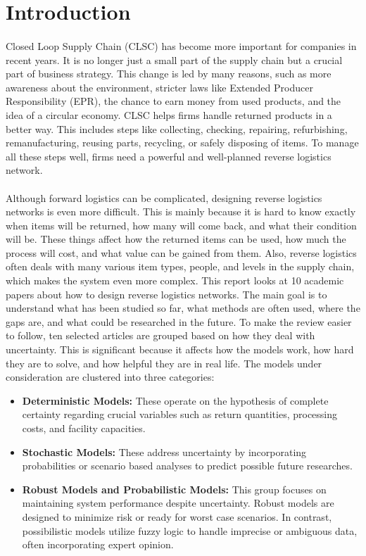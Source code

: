 \section{Introduction}

\paragraph{} Closed Loop Supply Chain (CLSC) has become more important for companies in recent years. It is no longer just a small part of the supply chain but a crucial part of business strategy. This change is led by many reasons, such as more awareness about the environment, stricter laws like Extended Producer Responsibility (EPR), the chance to earn money from used products, and the idea of a circular economy. CLSC helps firms handle returned products in a better way. This includes steps like collecting, checking, repairing, refurbishing, remanufacturing, reusing parts, recycling, or safely disposing of items. To manage all these steps well, firms need a powerful and well-planned reverse logistics network.

\paragraph{} Although forward logistics can be complicated, designing reverse logistics networks is even more difficult. This is mainly because it is hard to know exactly when items will be returned, how many will come back, and what their condition will be. These things affect how the returned items can be used, how much the process will cost, and what value can be gained from them. Also, reverse logistics often deals with many various item types, people, and levels in the supply chain, which makes the system even more complex.
This report looks at 10 academic papers about how to design reverse logistics networks. The main goal is to understand what has been studied so far, what methods are often used, where the gaps are, and what could be researched in the future. To make the review easier to follow, ten selected articles are grouped based on how they deal with uncertainty. This is significant because it affects how the models work, how hard they are to solve, and how helpful they are in real life.
The models under consideration are clustered into three categories:
\begin{itemize}
    \item \textbf{Deterministic Models:} These operate on the hypothesis of complete certainty regarding crucial variables such as return quantities, processing costs, and facility capacities.

    \item \textbf{Stochastic Models:} These address uncertainty by incorporating probabilities or scenario based analyses to predict possible future researches.
    \item \textbf{Robust Models and Probabilistic Models:} This group focuses on maintaining system performance despite uncertainty. Robust models are designed to minimize risk or ready for worst case scenarios. In contrast, possibilistic models utilize fuzzy logic to handle imprecise or ambiguous data, often incorporating expert opinion.
\end{itemize}

